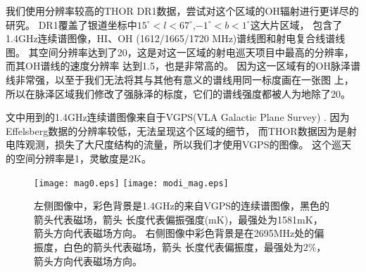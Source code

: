我们使用分辨率较高的THOR DR1数据\citep{Beuther2016}，尝试对这个区域的OH辐射进行更详尽的研究。
DR1覆盖了银道坐标中$15^{\circ}<l<67^{\circ}$,$-1^{\circ}<b<1^{\circ}$这大片区域，
包含了1.4GHz连续谱图像，HI、OH (1612/1665/1720 MHz)谱线图和射电复合线谱线图。
其空间分辨率达到了20\as，这是对这一区域的射电巡天项目中最高的分辨率，而其OH谱线的速度分辨率
达到1.5\kms，也是非常高的。
因为这一区域有的OH脉泽谱线非常强，以至于我们无法将其与其他有意义的谱线用同一标度画在一张图
上，所以在脉泽区域我们修改了强脉泽的标度，它们的谱线强度都被人为地除了20。

文中用到的1.4GHz连续谱图像来自于VGPS(VLA Galactic Plane Survey) \citep{Stil2006}.
因为Effelsberg数据的分辨率较低，无法呈现这个区域的细节，
而THOR数据因为是射电阵观测，损失了大尺度结构的流量，所以我们才使用VGPS的图像。
这个巡天的空间分辨率是1\am，灵敏度是2K。

\begin{figure*}
   \centering
   \texttt{[image: mag0.eps]}
   \texttt{[image: modi\_mag.eps]}
   \caption{左侧图像中，彩色背景是1.4GHz的来自VGPS的连续谱图像，黑色的箭头代表磁场，箭头
   长度代表偏振强度(mK)，最强处为1581mK，箭头方向代表磁场方向。
   右侧图像中彩色背景是在2695MHz处的偏振度，白色的箭头代表磁场，箭头
   长度代表偏振度，最强处为$2\%$，箭头方向代表磁场方向。
   }
\label{fig:mag}
\end{figure*}

